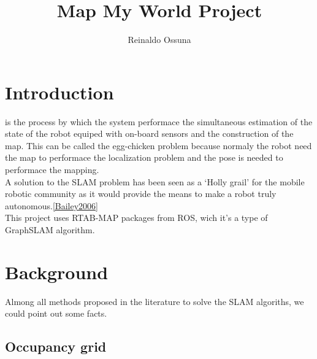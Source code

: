 \documentclass[10pt,journal,compsoc]{IEEEtran}
\begin{document}
\title{Map My World Project}



\author{Reinaldo Ossuna}

%
{}

\maketitle
\IEEEdisplaynontitleabstractindextext
\IEEEpeerreviewmaketitle
\section{Introduction}
\label{sec:introduction}

 is the process by which the system performace the simultaneous estimation of the state of the
robot equiped with on-board sensors and the construction of the map. This can be called the egg-chicken problem because
normaly the robot need the map to performace the localization problem and the pose is needed to performace the
mapping.\\
A solution to the SLAM problem has been seen as a `Holly grail' for the mobile robotic community as it would provide the
means to make a robot truly autonomous.\ref{Bailey2006}\\
This project uses RTAB-MAP packages from ROS, wich it's a type of GraphSLAM algorithm.


\section{Background}

Almong all methods proposed in the literature to solve the SLAM algoriths, we could point out some facts.

\subsection{Occupancy grid}
\end{document}
